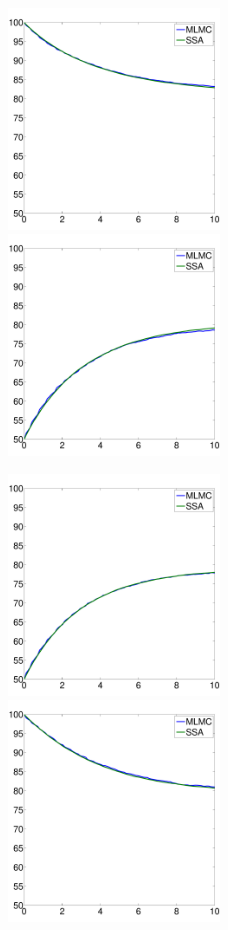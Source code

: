 \documentclass[ugrad,lot,lof,openright,11pt,oneside,onehalfspace]{RUthesis}
\begin{document}
			\begin{figure}[H]
			\centerline{
				\includegraphics[width=0.5\textwidth]{figures/PC_c1_mlmc.pdf}
				\includegraphics[width=0.5\textwidth]{figures/PC_c2_mlmc.pdf}
				}
			\centerline{
				\includegraphics[width=0.5\textwidth]{figures/PC_o_mlmc.pdf}
				\includegraphics[width=0.5\textwidth]{figures/PC_i_mlmc.pdf}
}
\end{figure}
\end{document}
